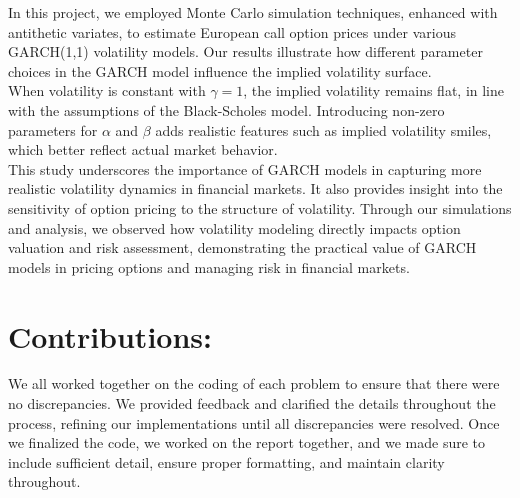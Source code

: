 \documentclass{report}
\begin{document}
In this project, we employed Monte Carlo simulation techniques, enhanced with antithetic variates, to estimate European call option prices under various GARCH(1,1) volatility models. Our results illustrate how different parameter choices in the GARCH model influence the implied volatility surface. \\

When volatility is constant with \( \gamma = 1 \), the implied volatility remains flat, in line with the assumptions of the Black-Scholes model. Introducing non-zero parameters for \( \alpha \) and \( \beta \) adds realistic features such as implied volatility smiles, which better reflect actual market behavior. \\

This study underscores the importance of GARCH models in capturing more realistic volatility dynamics in financial markets. It also provides insight into the sensitivity of option pricing to the structure of volatility. Through our simulations and analysis, we observed how volatility modeling directly impacts option valuation and risk assessment, demonstrating the practical value of GARCH models in pricing options and managing risk in financial markets. \\




\section*{Contributions:}
We all worked together on the coding of each problem to ensure that there were no discrepancies. We provided feedback and clarified the details throughout the process, refining our implementations until all discrepancies were resolved. Once we finalized the code, we worked on the report together, and we made sure to include sufficient detail, ensure proper formatting, and maintain clarity throughout.
\newpage
\end{document}
